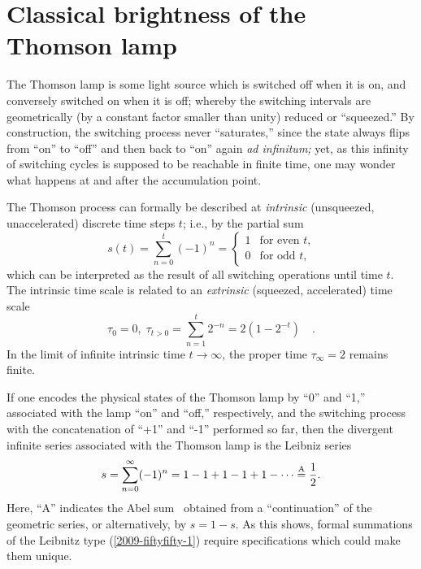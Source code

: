 \documentclass{llncs}
\begin{document}
\section{Classical brightness of the Thomson lamp}


The Thomson lamp is some light source which is switched off when it is on, and conversely switched on when it is off;
whereby the switching intervals are geometrically (by a constant factor smaller than unity) reduced or ``squeezed.''
By construction, the switching process never ``saturates,'' since the state always flips from ``on'' to ``off''
and then back to ``on'' again {\em ad infinitum;}
yet, as this infinity of switching cycles is supposed to be reachable in finite time,
one may wonder what happens at and after the accumulation point.

The Thomson process can formally be described at {\em intrinsic} (unsqueezed, unaccelerated)
discrete time steps $t$; i.e., by the partial sum
\begin{equation}
s(t)=\sum_{n=0}^t (-1)^n = \left\{
\begin{array}{ll}
1 &\textrm{for even $t$,}
\\ 0 &\textrm{for odd $t$,}
\end{array}
\right.
\end{equation}
which can be interpreted as the result of all switching operations until time $t$.
The intrinsic time scale is related to an {\em extrinsic} (squeezed, accelerated) time scale~\cite[p.~26]{svozil-93}
\begin{equation}
 \tau_0=0,\;
 \tau_{t>0}=\sum_{n=1}^t 2^{-n}=2\left(1-2^{-t}\right)\quad .
\end{equation}
In the limit
 of infinite intrinsic time $t\rightarrow \infty$, the proper time
 $\tau_\infty = 2$ remains finite.

If one encodes the physical states of the Thomson lamp by ``0'' and ``1,''
associated with the lamp ``on'' and ``off,'' respectively, and the switching process with the concatenation of ``+1'' and ``-1'' performed so far, then
the divergent infinite series associated with the Thomson lamp is
the Leibniz series~\cite{leibnitz-1860,moore-1938,Hardy:1949,everest-2003}
\begin{equation}
s = \sum_{n=0}^\infty (-1)^n=1-1+1-1+1-\cdots \stackrel{{\rm A}}{=} \frac{1}{2}.
\label{2009-fiftyfifty-1}
\end{equation}
Here, ``A'' indicates the Abel sum~\cite{Hardy:1949} obtained from a ``continuation'' of the geometric series, or alternatively, by
$s= 1-s$.
As this shows, formal summations of the Leibnitz type (\ref{2009-fiftyfifty-1}) require specifications
which could make them unique.
\end{document}
